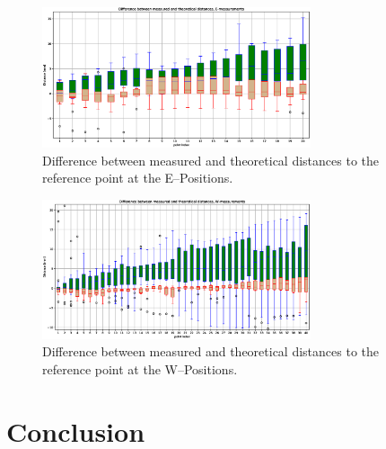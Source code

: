 \documentclass{VRARWorkshop}
\begin{document}
\begin{figure}[h!]
    \begin{center}
        \includegraphics[width=79mm]{images/distancesBoxplot-E.eps}
        \caption{\label{fig:boxplotE} Difference between measured and theoretical distances to the reference point at the E--Positions.}
    \end{center}
\end{figure}

\begin{figure}[h!]
    \begin{center}
        \includegraphics[width=79mm]{images/distancesBoxplot-W.eps}
        \caption{\label{fig:boxplotW} Difference between measured and theoretical distances to the reference point at the W--Positions.}
    \end{center}
\end{figure}

\section{Conclusion}

\VRARsetbibstyle

\end{document}
